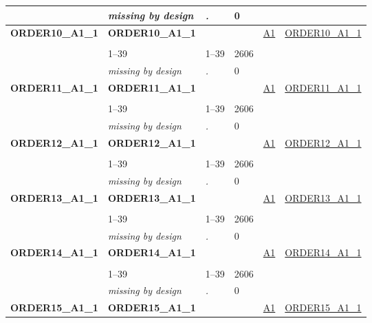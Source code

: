 \begin{longtable}{| L{2.45cm} | L{6cm} | C{1.5cm} | R{1cm} | C{2.25cm} | C{2.25cm} |}
   & \textit{missing by design} & \textit{.} & 0 &  &  \\ 
   \midrule
\textbf{ORDER10\_A1\_1}\label{var:ORDER10:A1:1} & \textbf{ORDER10\_A1\_1} &  &  & \hyperref[A1]{A1} & \hyperref[var:suf:ORDER10:A1:1]{ORDER10\_A1\_1} \\ 
   &  &  &  &  &  \\ 
   & 1--39 & 1--39 & 2606 &  &  \\ 
   & \textit{missing by design} & \textit{.} & 0 &  &  \\ 
   \midrule
\textbf{ORDER11\_A1\_1}\label{var:ORDER11:A1:1} & \textbf{ORDER11\_A1\_1} &  &  & \hyperref[A1]{A1} & \hyperref[var:suf:ORDER11:A1:1]{ORDER11\_A1\_1} \\ 
   &  &  &  &  &  \\ 
   & 1--39 & 1--39 & 2606 &  &  \\ 
   & \textit{missing by design} & \textit{.} & 0 &  &  \\ 
   \midrule
\textbf{ORDER12\_A1\_1}\label{var:ORDER12:A1:1} & \textbf{ORDER12\_A1\_1} &  &  & \hyperref[A1]{A1} & \hyperref[var:suf:ORDER12:A1:1]{ORDER12\_A1\_1} \\ 
   &  &  &  &  &  \\ 
   & 1--39 & 1--39 & 2606 &  &  \\ 
   & \textit{missing by design} & \textit{.} & 0 &  &  \\ 
   \midrule
\textbf{ORDER13\_A1\_1}\label{var:ORDER13:A1:1} & \textbf{ORDER13\_A1\_1} &  &  & \hyperref[A1]{A1} & \hyperref[var:suf:ORDER13:A1:1]{ORDER13\_A1\_1} \\ 
   &  &  &  &  &  \\ 
   & 1--39 & 1--39 & 2606 &  &  \\ 
   & \textit{missing by design} & \textit{.} & 0 &  &  \\ 
   \midrule
\textbf{ORDER14\_A1\_1}\label{var:ORDER14:A1:1} & \textbf{ORDER14\_A1\_1} &  &  & \hyperref[A1]{A1} & \hyperref[var:suf:ORDER14:A1:1]{ORDER14\_A1\_1} \\ 
   &  &  &  &  &  \\ 
   & 1--39 & 1--39 & 2606 &  &  \\ 
   & \textit{missing by design} & \textit{.} & 0 &  &  \\ 
   \midrule
\textbf{ORDER15\_A1\_1}\label{var:ORDER15:A1:1} & \textbf{ORDER15\_A1\_1} &  &  & \hyperref[A1]{A1} & \hyperref[var:suf:ORDER15:A1:1]{ORDER15\_A1\_1} \\ 

\end{longtable}
